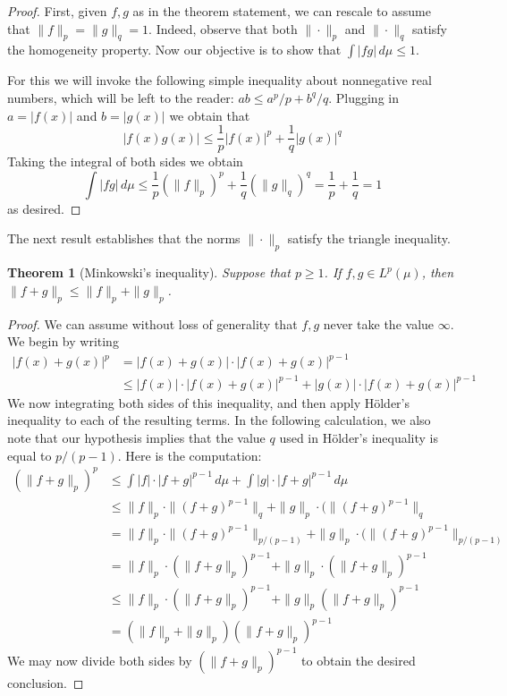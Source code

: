 \documentclass[11pt,oneside]{amsbook}
\theoremstyle{definition}
\theoremstyle{plain}
\newtheorem{thm}{Theorem}[section]
\theoremstyle{definition}
\theoremstyle{remark}
\numberwithin{equation}{section}
\numberwithin{figure}{section}
\begin{document}
\begin{proof}
  First, given $f,g$ as in the theorem statement, we can rescale to assume that $\|f\|_p=\|g\|_q=1$. Indeed, observe that both $\|\cdot\|_p$ and $\|\cdot\|_q$ satisfy the homogeneity property. Now our objective is to show that $\int|fg|\,d\mu\leq1$.

  For this we will invoke the following simple inequality about nonnegative real numbers, which will be left to the reader: $ab\leq a^p/p+b^q/q$. Plugging in $a=|f(x)|$ and $b=|g(x)|$ we obtain that
  \[|f(x)g(x)|\leq\frac1p|f(x)|^p+\frac1q|g(x)|^q
  \]
  Taking the integral of both sides we obtain
  \[\int|fg|\,d\mu\leq\frac1p(\|f\|_p)^p+\frac1q(\|g\|_q)^q
    =\frac1p+\frac1q=1
  \]
  as desired.
\end{proof}

The next result establishes that the norms $\|\cdot\|_p$ satisfy the triangle inequality.

\begin{thm}[Minkowski's inequality]
  Suppose that $p\geq1$. If $f,g\in L^p(\mu)$, then $\|f+g\|_p\leq\|f\|_p+\|g\|_p$.
\end{thm}

\begin{proof}
  We can assume without loss of generality that $f,g$ never take the value $\infty$. We begin by writing
  \begin{align*}
    |f(x)+g(x)|^p&=|f(x)+g(x)|\cdot|f(x)+g(x)|^{p-1}\\
                 &\leq|f(x)|\cdot|f(x)+g(x)|^{p-1}
                   +|g(x)|\cdot|f(x)+g(x)|^{p-1}
  \end{align*}
  We now integrating both sides of this inequality, and then apply H\"older's inequality to each of the resulting terms. In the following calculation, we also note that our hypothesis implies that the value $q$ used in H\"older's inequality is equal to $p/(p-1)$. Here is the computation:
  \begin{align*}
    (\|f+g\|_p)^p&\leq\int|f|\cdot|f+g|^{p-1}\,d\mu
                   +\int|g|\cdot|f+g|^{p-1}\,d\mu\\
                 &\leq\|f\|_p\cdot\|(f+g)^{p-1}\|_q
                   +\|g\|_p\cdot(\|(f+g)^{p-1}\|_q\\
                 &=\|f\|_p\cdot\|(f+g)^{p-1}\|_{p/(p-1)}
                   +\|g\|_p\cdot(\|(f+g)^{p-1}\|_{p/(p-1)}\\
                 &=\|f\|_p\cdot(\|f+g\|_p)^{p-1}
                   +\|g\|_p\cdot(\|f+g\|_p)^{p-1}\\
                 &\leq\|f\|_p\cdot(\|f+g\|_p)^{p-1}
                   +\|g\|_p(\|f+g\|_p)^{p-1}\\
                 &=(\|f\|_p+\|g\|_p)(\|f+g\|_p)^{p-1}
  \end{align*}
  We may now divide both sides by $(\|f+g\|_p)^{p-1}$ to obtain the desired conclusion.
\end{proof}
\end{document}

